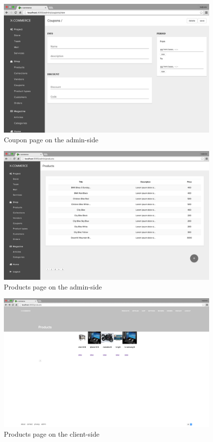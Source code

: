 \begin{figure}[htb]
\centering
\includegraphics[width=0.84\linewidth]{images/chapter4/page-coupon-all.png}\hfill
\caption[Coupon page on the admin-side]{Coupon page on the admin-side}
\label{fig:page_coupon_admin}
\end{figure}
\newpage
\begin{figure}[htb]
\centering
\includegraphics[width=0.84\linewidth]{images/chapter4/page-products-all.png}\hfill
\caption[Products page on the admin-side]{Products page on the admin-side}
\label{fig:page_products_admin}
\end{figure}
\begin{figure}[htb]
\centering
\includegraphics[width=0.84\linewidth]{images/chapter4/page-products-all-cli.png}\hfill
\caption[Products page on the client-side]{Products page on the client-side}
\label{fig:page_products_cli}
\end{figure}
